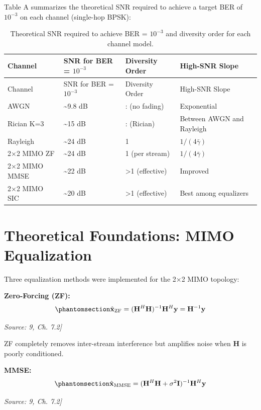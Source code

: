 Table A summarizes the theoretical SNR required to achieve a target BER of \(10^{-3}\) on each channel (single-hop BPSK):

\begin{longtable}[]{@{}llll@{}}
\caption{Theoretical SNR required to achieve BER = \(10^{-3}\) and diversity order for each channel model.}\label{tbl:table26}\tabularnewline
\toprule\noalign{}
Channel & SNR for BER = \(10^{-3}\) & Diversity Order & High-SNR Slope \\
\midrule\noalign{}
\endfirsthead
\toprule\noalign{}
Channel & SNR for BER = \(10^{-3}\) & Diversity Order & High-SNR Slope \\
\midrule\noalign{}
\endhead
\bottomrule\noalign{}
\endlastfoot
AWGN & \textasciitilde9.8 dB & : (no fading) & Exponential \\
Rician K=3 & \textasciitilde15 dB & : (Rician) & Between AWGN and Rayleigh \\
Rayleigh & \textasciitilde24 dB & 1 & \(1/(4\bar{\gamma})\) \\
2×2 MIMO ZF & \textasciitilde24 dB & 1 (per stream) & \(1/(4\bar{\gamma})\) \\
2×2 MIMO MMSE & \textasciitilde22 dB & \textgreater1 (effective) & Improved \\
2×2 MIMO SIC & \textasciitilde20 dB & \textgreater1 (effective) & Best among equalizers \\
\end{longtable}

\section{Theoretical Foundations: MIMO Equalization}\label{sec:theoretical-foundations-mimo-equalization}

Three equalization methods were implemented for the 2×2 MIMO topology:

\textbf{Zero-Forcing (ZF):} \begin{equation}\protect\phantomsection\label{eq:zf-equalizer-methods}{\hat{\mathbf{x}}_{\text{ZF}} = (\mathbf{H}^H\mathbf{H})^{-1}\mathbf{H}^H\mathbf{y} = \mathbf{H}^{-1}\mathbf{y}
}\end{equation} \par{\small\textit{Source: \cite{Laneman2004CooperativeDiversity}9, Ch. 7.2]}}

ZF completely removes inter-stream interference but amplifies noise when \(\mathbf{H}\) is poorly conditioned.

\textbf{MMSE:} \begin{equation}\protect\phantomsection\label{eq:mmse-equalizer-methods}{\hat{\mathbf{x}}_{\text{MMSE}} = (\mathbf{H}^H\mathbf{H} + \sigma^2\mathbf{I})^{-1}\mathbf{H}^H\mathbf{y}
}\end{equation} \par{\small\textit{Source: \cite{Laneman2004CooperativeDiversity}9, Ch. 7.2]}}

